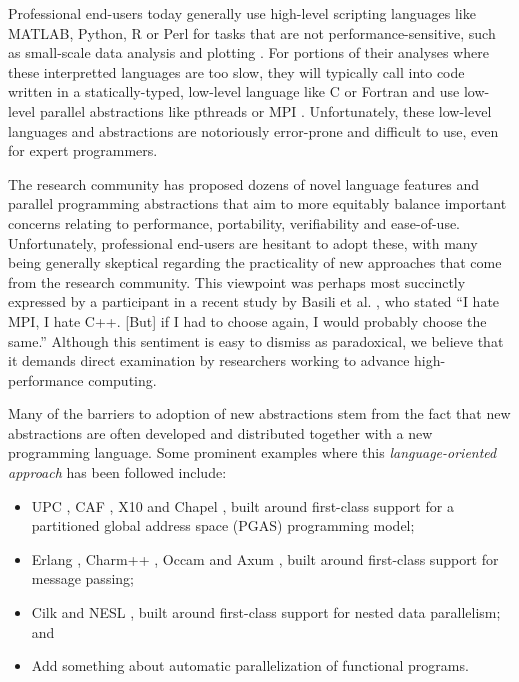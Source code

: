 \documentclass[10pt, conference, compsocconf]{IEEEtran}
\begin{document}
Professional end-users today generally use high-level scripting languages like MATLAB, Python, R or Perl for tasks that are not performance-sensitive, such as small-scale data analysis and plotting \cite{nguyen2010survey}. For portions of their analyses where these interpretted languages are too slow, they will typically call into code written in a statically-typed, low-level language like C or Fortran and use low-level parallel abstractions like pthreads or MPI \cite{4222616,basili2008understanding}. Unfortunately, these low-level languages and abstractions are notoriously error-prone and difficult to use, even for expert programmers.

The research community has proposed dozens of novel language features and parallel programming abstractions that aim to  more equitably balance important concerns relating to performance, portability, verifiability and ease-of-use. Unfortunately, professional end-users are hesitant to adopt these, with many being generally skeptical regarding the practicality of new approaches that come from the research community. This viewpoint was perhaps most succinctly expressed by a participant in a recent study by Basili et al. \cite{basili2008understanding}, who stated ``I hate MPI, I hate C++. [But] if I had to choose again, I would probably choose the same.'' Although this sentiment is easy to dismiss as paradoxical, we believe that it demands direct examination by researchers working to advance high-performance computing. 

Many of the barriers to adoption of new abstractions stem from the fact that new abstractions are often developed and distributed together with a new programming language. Some prominent examples where this {\em language-oriented approach} has been followed include:
\begin{itemize}
\item UPC \cite{upc}, CAF \cite{caf}, X10 \cite{x10} and Chapel \cite{chapel}, built around first-class support for a partitioned global address space (PGAS) programming model; 
\item Erlang \cite{erlang}, Charm++ \cite{charm}, Occam \cite{occam} and Axum \cite{axum}, built around first-class support for message passing;
\item Cilk \cite{cilk} and NESL \cite{nesl}, built around first-class support for nested data parallelism; and
\item Add something about automatic parallelization of functional programs.
\end{itemize}
\end{document}
